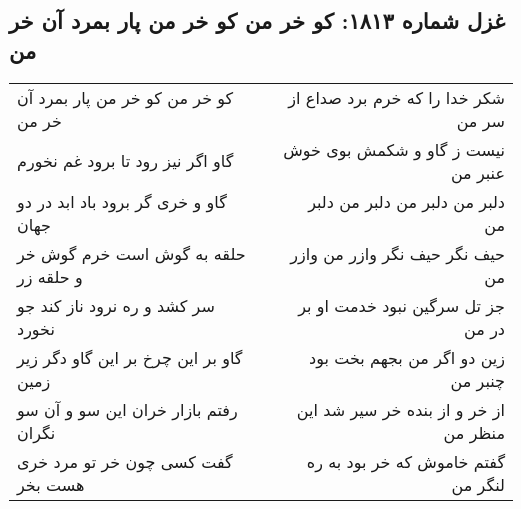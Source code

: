 \begin{center}
\section*{غزل شماره ۱۸۱۳: کو خر من کو خر من پار بمرد آن خر من}
\label{sec:1813}
\begin{longtable}{l p{0.5cm} r}
کو خر من کو خر من پار بمرد آن خر من
&&
شکر خدا را که خرم برد صداع از سر من
\\
گاو اگر نیز رود تا برود غم نخورم
&&
نیست ز گاو و شکمش بوی خوش عنبر من
\\
گاو و خری گر برود باد ابد در دو جهان
&&
دلبر من دلبر من دلبر من دلبر من
\\
حلقه به گوش است خرم گوش خر و حلقه زر
&&
حیف نگر حیف نگر وازر من وازر من
\\
سر کشد و ره نرود ناز کند جو نخورد
&&
جز تل سرگین نبود خدمت او بر در من
\\
گاو بر این چرخ بر این گاو دگر زیر زمین
&&
زین دو اگر من بجهم بخت بود چنبر من
\\
رفتم بازار خران این سو و آن سو نگران
&&
از خر و از بنده خر سیر شد این منظر من
\\
گفت کسی چون خر تو مرد خری هست بخر
&&
گفتم خاموش که خر بود به ره لنگر من
\\
\end{longtable}
\end{center}
